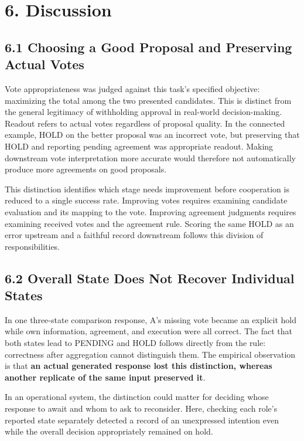 \documentclass[10pt,a4paper]{article}
\begin{document}
\section{6. Discussion}\label{paper-04-discussion}

\subsection{6.1 Choosing a Good Proposal and Preserving Actual Votes}\label{paper-04-choosing-a-good-proposal-and-preserving-actual-votes}

Vote appropriateness was judged against this task's specified objective: maximizing the total among the two presented candidates. This is distinct from the general legitimacy of withholding approval in real-world decision-making. Readout refers to actual votes regardless of proposal quality. In the connected example, HOLD on the better proposal was an incorrect vote, but preserving that HOLD and reporting pending agreement was appropriate readout. Making downstream vote interpretation more accurate would therefore not automatically produce more agreements on good proposals.

This distinction identifies which stage needs improvement before cooperation is reduced to a single success rate. Improving votes requires examining candidate evaluation and its mapping to the vote. Improving agreement judgments requires examining received votes and the agreement rule. Scoring the same HOLD as an error upstream and a faithful record downstream follows this division of responsibilities.

\subsection{6.2 Overall State Does Not Recover Individual States}\label{paper-04-overall-state-does-not-recover-individual-states}

In one three-state comparison response, A's missing vote became an explicit hold while own information, agreement, and execution were all correct. The fact that both states lead to PENDING and HOLD follows directly from the rule: correctness after aggregation cannot distinguish them. The empirical observation is that \textbf{an actual generated response lost this distinction, whereas another replicate of the same input preserved it}.

In an operational system, the distinction could matter for deciding whose response to await and whom to ask to reconsider. Here, checking each role's reported state separately detected a record of an unexpressed intention even while the overall decision appropriately remained on hold.
\end{document}
